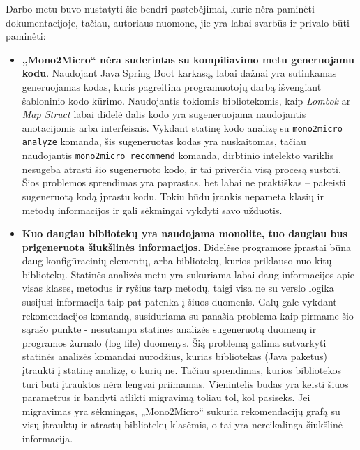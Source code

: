 \documentclass{VUMIFPSbakalaurinis}
\begin{document}
Darbo metu buvo nustatyti šie bendri pastebėjimai, kurie nėra paminėti dokumentacijoje, tačiau, autoriaus nuomone, jie yra labai svarbūs ir privalo būti paminėti:
\begin{itemize}
    \item \textbf{„Mono2Micro“ nėra suderintas su kompiliavimo metu generuojamu kodu}. Naudojant Java Spring Boot karkasą, labai dažnai yra sutinkamas generuojamas kodas, kuris pagreitina programuotojų darbą išvengiant šabloninio kodo kūrimo. Naudojantis tokiomis bibliotekomis, kaip \emph{Lombok} ar \emph{Map Struct} labai didelė dalis kodo yra sugeneruojama naudojantis anotacijomis arba interfeisais. Vykdant statinę kodo analizę su \verb|mono2micro analyze| komanda, šis sugeneruotas kodas yra nuskaitomas, tačiau naudojantis \verb|mono2micro recommend| komanda, dirbtinio intelekto variklis nesugeba atrasti šio sugeneruoto kodo, ir tai priverčia visą procesą sustoti. Šios problemos sprendimas yra paprastas, bet labai ne praktiškas -- pakeisti sugeneruotą kodą įprastu kodu. Tokiu būdu įrankis nepameta klasių ir metodų informacijos ir gali sėkmingai vykdyti savo užduotis.

    \item \textbf{Kuo daugiau bibliotekų yra naudojama monolite, tuo daugiau bus prigeneruota šiukšlinės informacijos}. Didelėse programose įprastai būna daug konfigūracinių elementų, arba bibliotekų, kurios priklauso nuo kitų bibliotekų. Statinės analizės metu yra sukuriama labai daug informacijos apie visas klases, metodus ir ryšius tarp metodų, taigi visa ne su verslo logika susijusi informacija taip pat patenka į šiuos duomenis. Galų gale vykdant rekomendacijos komandą, susiduriama su panašia problema kaip pirmame šio sąrašo punkte - nesutampa statinės analizės sugeneruotų duomenų ir programos žurnalo (log file) duomenys. Šią problemą galima sutvarkyti statinės analizės komandai nurodžius, kurias bibliotekas (Java paketus) įtraukti į statinę analizę, o kurių ne. Tačiau sprendimas, kurios bibliotekos turi būti įtrauktos nėra lengvai priimamas. Vienintelis būdas yra keisti šiuos parametrus ir bandyti atlikti migravimą toliau tol, kol pasiseks. Jei migravimas yra sėkmingas, „Mono2Micro“ sukuria rekomendacijų grafą su visų įtrauktų ir atrastų bibliotekų klasėmis, o tai yra nereikalinga šiukšlinė informacija.


\end{itemize}
\end{document}
